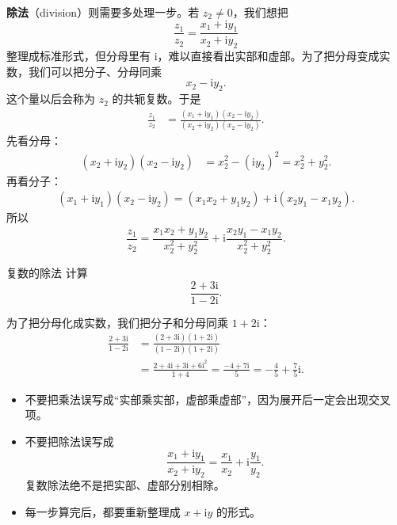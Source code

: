 \medskip
\noindent\textbf{除法}（division）则需要多处理一步。若 $z_2\neq 0$，我们想把
\[
\frac{z_1}{z_2}=\frac{x_1+\mathrm{i}y_1}{x_2+\mathrm{i}y_2}
\]
整理成标准形式，但分母里有 $\mathrm{i}$，难以直接看出实部和虚部。为了把分母变成实数，我们可以把分子、分母同乘
\[
x_2-\mathrm{i}y_2.
\]
这个量以后会称为 $z_2$ 的共轭复数。于是
\begin{align*}
    \frac{z_1}{z_2}
    &=\frac{(x_1+\mathrm{i}y_1)(x_2-\mathrm{i}y_2)}{(x_2+\mathrm{i}y_2)(x_2-\mathrm{i}y_2)}.
\end{align*}
先看分母：
\begin{align*}
    (x_2+\mathrm{i}y_2)(x_2-\mathrm{i}y_2)
    &=x_2^2-(\mathrm{i}y_2)^2=x_2^2+y_2^2.
\end{align*}
再看分子：
\begin{align*}
    (x_1+\mathrm{i}y_1)(x_2-\mathrm{i}y_2)
    =(x_1x_2+y_1y_2)+\mathrm{i}(x_2y_1-x_1y_2).
\end{align*}
所以
\begin{equation}\label{eq:complex-division-algebraic}
    \frac{z_1}{z_2}
    =\frac{x_1x_2+y_1y_2}{x_2^2+y_2^2} + \mathrm{i}\frac{x_2y_1-x_1y_2}{x_2^2+y_2^2}.
\end{equation}

\begin{lizi}{复数的除法}{}
计算
\[
\frac{2+3\mathrm{i}}{1-2\mathrm{i}}.
\]

\begin{jie}
为了把分母化成实数，我们把分子和分母同乘 $1+2\mathrm{i}$：
\begin{align*}
    \frac{2+3\mathrm{i}}{1-2\mathrm{i}}
    &=\frac{(2+3\mathrm{i})(1+2\mathrm{i})}{(1-2\mathrm{i})(1+2\mathrm{i})}\\
    &=\frac{2+4\mathrm{i}+3\mathrm{i}+6\mathrm{i}^2}{1+4}
    =\frac{-4+7\mathrm{i}}{5}
    =-\frac{4}{5}+\frac{7}{5}\mathrm{i}.
\end{align*}
\end{jie}
\end{lizi}

\begin{jinshi}[乘法与除法容易错的地方]
\begin{itemize}
    \item 不要把乘法误写成``实部乘实部，虚部乘虚部''，因为展开后一定会出现交叉项。
    \item 不要把除法误写成
    \[
        \frac{x_1+\mathrm{i}y_1}{x_2+\mathrm{i}y_2}
        =\frac{x_1}{x_2}+\mathrm{i}\frac{y_1}{y_2}.
    \]
    复数除法绝不是把实部、虚部分别相除。
    \item 每一步算完后，都要重新整理成 $x+\mathrm{i}y$ 的形式。
\end{itemize}
\end{jinshi}

